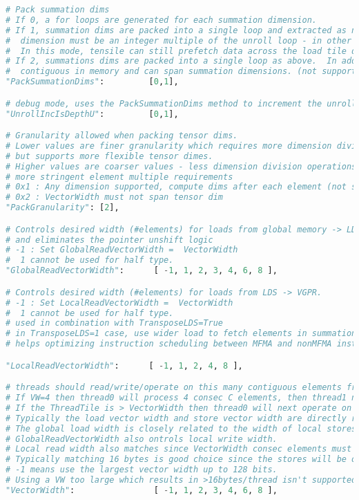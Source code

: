 \documentclass[]{article}
\begin{document}
\begin{lstlisting}[language=python,breaklines=true]
# Pack summation dims
# If 0, a for loops are generated for each summation dimension.
# If 1, summation dims are packed into a single loop and extracted as needed using mod/shift.  The innermost summation
#  dimension must be an integer multiple of the unroll loop - in other words the load tile is contiguous in memory.
#  In this mode, tensile can still prefetch data across the load tile dimension.
# If 2, summations dims are packed into a single loop as above.  In addition, the load tile does not need to be
#  contiguous in memory and can span summation dimensions. (not supported yet)
"PackSummationDims":         [0,1],

# debug mode, uses the PackSummationDims method to increment the unroll loop counter
"UnrollIncIsDepthU":         [0,1],

# Granularity allowed when packing tensor dims.
# Lower values are finer granularity which requires more dimension division operations on store path
# but supports more flexible tensor dimes.
# Higher values are coarser values - less dimension division operations but tensor dims must meet
# more stringent element multiple requirements
# 0x1 : Any dimension supported, compute dims after each element (not supported yet)
# 0x2 : VectorWidth must not span tensor dim
"PackGranularity": [2],

# Controls desired width (#elements) for loads from global memory -> LDS.
# and eliminates the pointer unshift logic
# -1 : Set GlobalReadVectorWidth =  VectorWidth
#  1 cannot be used for half type.
"GlobalReadVectorWidth":      [ -1, 1, 2, 3, 4, 6, 8 ],

# Controls desired width (#elements) for loads from LDS -> VGPR.
# -1 : Set LocalReadVectorWidth =  VectorWidth
#  1 cannot be used for half type.
# used in combination with TransposeLDS=True
# in TransposeLDS=1 case, use wider load to fetch elements in summation dimension from LDS
# helps optimizing instruction scheduling between MFMA and nonMFMA instructions

"LocalReadVectorWidth":      [ -1, 1, 2, 4, 8 ],

# threads should read/write/operate on this many contiguous elements from the C matrix.
# If VW=4 then thread0 will process 4 consec C elements, then thread1 next 4, etc.
# If the ThreadTile is > VectorWidth then thread0 will next operate on the 4 elements in C at (4*NumThreads)
# Typically the load vector width and store vector width are directly related to the VW.
# The global load width is closely related to the width of local stores so
# GlobalReadVectorWidth also ontrols local write width.
# Local read width also matches since VectorWidth consec elements must be read
# Typically matching 16 bytes is good choice since the stores will be optimally coalesced with 16 bytes/WI.
# -1 means use the largest vector width up to 128 bits.
# Using a VW too large which results in >16bytes/thread isn't supported
"VectorWidth":                [ -1, 1, 2, 3, 4, 6, 8 ],


\end{lstlisting}
\end{document}
